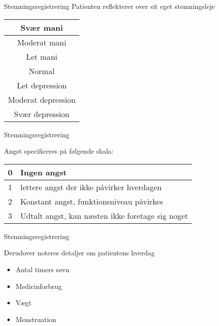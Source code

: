 \begin{frame}{Stemningsregistrering} %
	Patienten reflekterer over sit eget stemningsleje
	
	\begin{center}
	\begin{tabular}{|c|}
		\hline \cellcolor{red!90} Svær mani \\ 
		\hline \cellcolor{red!60} Moderat mani \\ 
		\hline \cellcolor{red!30} Let mani \\ 
		\hline \cellcolor{yellow!70} Normal \\ 
		\hline \cellcolor{blue!30} Let depression \\ 
		\hline \cellcolor{blue!60} Moderat depression \\ 
		\hline \cellcolor{blue!90} Svær depression \\ 
		\hline 
	\end{tabular} 
	\end{center}
\end{frame}
	
{ %
	\begin{frame}{Stemningsregistrering} %

		Angst specificeres på følgende skala:
		\begin{tabular}{| c | l|}
			\hline 0 & Ingen angst \\ 
			\hline 1 & lettere angst der ikke påvirker hverdagen\\ 
			\hline 2 & Konstant angst, funktionsniveau påvirkes\\ 
			\hline 3 & Udtalt angst, kan næsten ikke foretage sig noget\\
			\hline
		\end{tabular} 
	\end{frame}}
	
{ %
	\begin{frame}{Stemningsregistrering} %
		
		Derudover noteres detaljer om patientens hverdag
		\begin{itemize}
			\item Antal timers søvn
			\item Medicinforbrug
			\item Vægt
			\item Menstruation
		\end{itemize}
	\end{frame}}
	
